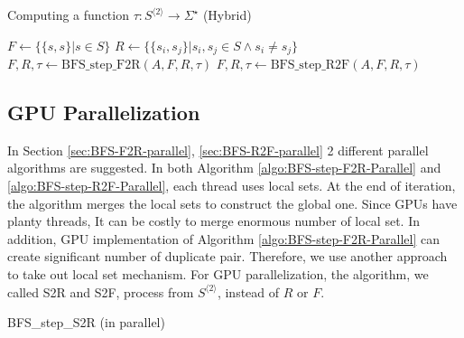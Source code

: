 \documentclass[12pt]{article}
\newcommand{\comment}[2]{{\color{red}{\bf (#1: #2)}}}
\begin{document}
\begin{algorithm}[ht]
	\label{algo:BFS-Hybrid}
	\caption{Computing a function $\tau : S^{\langle 2 \rangle} \rightarrow \Sigma^\star$ (Hybrid)}
	
	

	
	$F \longleftarrow \{ \{ s,s \} | s \in S \}$\;
	$R \longleftarrow \{ \{ s_i,s_j \} | s_i,s_j \in S \wedge s_i \neq s_j \}$\;
	{
		{
			$F,R,\tau \longleftarrow \mbox{BFS\_step\_F2R}(A,F,R,\tau)$\;
		}
		\Else
		{
			$F,R,\tau \longleftarrow \mbox{BFS\_step\_R2F}(A,F,R,\tau)$\;
		}
	}
\end{algorithm}

\subsection{GPU Parallelization}
\label{sec:BFS-GPU}
\comment{sertac}{intro olarak GPU mimariden burada mi bahsetmeli?}
In Section \ref{sec:BFS-F2R-parallel}, \ref{sec:BFS-R2F-parallel} 2 different parallel algorithms are suggested. In both Algorithm \ref{algo:BFS-step-F2R-Parallel} and \ref{algo:BFS-step-R2F-Parallel}, each thread uses local sets. At the end of iteration, the algorithm merges the local sets to construct the global one. Since GPUs have planty threads, It can be costly to merge enormous number of local set. In addition, GPU implementation of Algorithm \ref{algo:BFS-step-F2R-Parallel} can create significant number of duplicate pair. Therefore, we use another approach to take out local set mechanism. For GPU parallelization, the algorithm, we called S2R and S2F, process from $S^{\langle 2 \rangle}$, instead of $R$ or $F$. 

\begin{algorithm}[ht]
	\label{algo:BFS-step-S2R-Parallel}
	\caption{BFS\_step\_S2R (in parallel)}
	
	
	{
	}
	
\end{algorithm}
\end{document}
